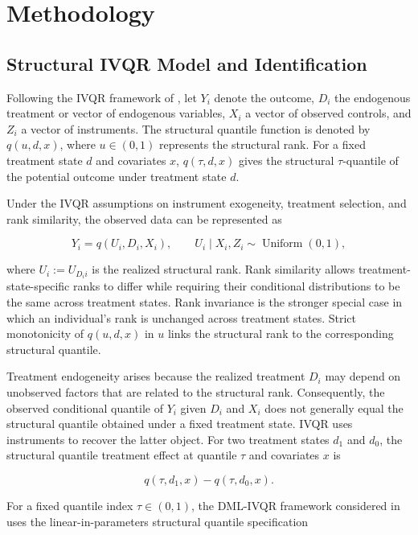 \section{Methodology}

\subsection{Structural IVQR Model and Identification}

Following the IVQR framework of \textcite{chernozhukov_hansen_2005}, let \(Y_i\) denote the outcome, \(D_i\) the endogenous treatment or vector of endogenous variables, \(X_i\) a vector of observed controls, and \(Z_i\) a vector of instruments. The structural quantile function is denoted by \(q(u,d,x)\), where \(u\in(0,1)\) represents the structural rank. For a fixed treatment state \(d\) and covariates \(x\), \(q(\tau,d,x)\) gives the structural \(\tau\)-quantile of the potential outcome under treatment state \(d\).

Under the IVQR assumptions on instrument exogeneity, treatment selection, and rank similarity, the observed data can be represented as

\begin{equation}
    Y_i = q(U_i,D_i,X_i),
    \qquad
    U_i \mid X_i,Z_i \sim \operatorname{Uniform}(0,1),
    \label{eq:structural-ivqr}
\end{equation}

where \(U_i:=U_{D_i i}\) is the realized structural rank. Rank similarity allows treatment-state-specific ranks to differ while requiring their conditional distributions to be the same across treatment states. Rank invariance is the stronger special case in which an individual's rank is unchanged across treatment states. Strict monotonicity of \(q(u,d,x)\) in \(u\) links the structural rank to the corresponding structural quantile.

Treatment endogeneity arises because the realized treatment \(D_i\) may depend on unobserved factors that are related to the structural rank. Consequently, the observed conditional quantile of \(Y_i\) given \(D_i\) and \(X_i\) does not generally equal the structural quantile obtained under a fixed treatment state. IVQR uses instruments to recover the latter object. For two treatment states \(d_1\) and \(d_0\), the structural quantile treatment effect at quantile \(\tau\) and covariates \(x\) is

\[
    q(\tau,d_1,x)-q(\tau,d_0,x).
\]

For a fixed quantile index \(\tau\in(0,1)\), the DML-IVQR framework considered in \textcite{chen_huang_tien_2021} uses the linear-in-parameters structural quantile specification

